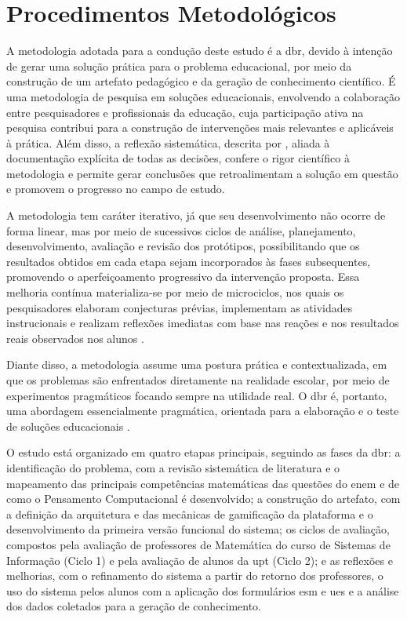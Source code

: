 
\chapter{Procedimentos Metodológicos}
\label{ch:metodologia}
A metodologia adotada para a condução deste estudo é a \gls{dbr}, devido à
intenção de gerar uma solução prática para o problema educacional, por meio da
construção de um artefato pedagógico e da geração de conhecimento científico. É
uma metodologia de pesquisa em soluções educacionais, envolvendo a colaboração
entre pesquisadores e profissionais da educação, cuja participação ativa na
pesquisa contribui para a construção de intervenções mais relevantes e
aplicáveis à prática. Além disso, a reflexão sistemática, descrita por
\cite{obrien2018practical}, aliada à documentação explícita de todas as
decisões, confere o rigor científico à metodologia e permite gerar conclusões
que retroalimentam a solução em questão e promovem o progresso no campo de
estudo.

A metodologia tem caráter iterativo, já que seu desenvolvimento não ocorre de
forma linear, mas por meio de sucessivos ciclos de análise, planejamento,
desenvolvimento, avaliação e revisão dos protótipos, possibilitando que os
resultados obtidos em cada etapa sejam incorporados às fases subsequentes,
promovendo o aperfeiçoamento progressivo da intervenção proposta. Essa melhoria
contínua materializa-se por meio de microciclos, nos quais os pesquisadores
elaboram conjecturas prévias, implementam as atividades instrucionais e realizam
reflexões imediatas com base nas reações e nos resultados reais observados nos
alunos \cite{obrien2018practical}. 

Diante disso, a metodologia assume uma postura prática e contextualizada, em que
os problemas são enfrentados diretamente na realidade escolar, por meio de
experimentos pragmáticos focando sempre na utilidade real. O \gls{dbr} é, portanto,
uma abordagem essencialmente pragmática, orientada para a elaboração e o teste
de soluções educacionais \cite{obrien2018practical}.

O estudo está organizado em quatro etapas principais, seguindo as fases da
\gls{dbr}: a identificação do problema, com a revisão sistemática de literatura e
o mapeamento das principais competências matemáticas das questões do \gls{enem} e
de como o Pensamento Computacional é desenvolvido; a construção do artefato, com
a definição da arquitetura e das mecânicas de gamificação da plataforma e o
desenvolvimento da primeira versão funcional do sistema; os ciclos de avaliação,
compostos pela avaliação de professores de Matemática do curso de Sistemas de
Informação (Ciclo 1) e pela avaliação de alunos da \gls{upt} (Ciclo 2); e as
reflexões e melhorias, com o refinamento do sistema a partir do retorno dos
professores, o uso do sistema pelos alunos com a aplicação dos formulários
\gls{esm} e \gls{ues} e a análise dos dados coletados para a geração de
conhecimento.

